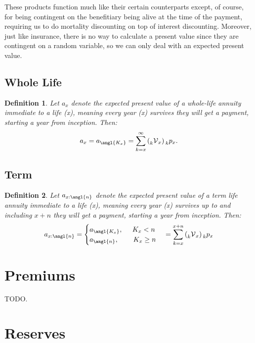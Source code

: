 \documentclass[a4paper]{report}
\newtheorem{definition}{Definition}
\newcommand{\p}[2]{\prescript{}{#1}{p}_{#2}}
\newcommand{\disc}[2]{\prescript{}{#1}{\mathcal{V}}_{#2}}
\begin{document}
  These products function much like their certain 
  counterparts except, of course, for being contingent on 
  the benefitiary being alive at the time of the payment, 
  requiring us to do mortality discounting on top of 
  interest discounting. 
  Moreover, just like insurance, there is no way to 
  calculate a present value since they are contingent on a 
  random variable, so we can only deal with an expected 
  present value.

  \subsection{Whole Life}
  \begin{definition}
    Let $a_x$ denote the expected present value of a 
    whole-life annuity immediate to a life (x), 
    meaning every year (x) survives they will get a payment,      starting a year from inception. Then:
    \[
      a_x = a_{\angl{K_x}} 
      = \sum^{\infty}_{k=x} \left(\disc{k}{x}\right)\p{k}{x}
    .\] 
  \end{definition}

  \subsection{Term}
  \begin{definition}
    Let $a_{x:\angl{n}}$ denote the expected present value 
    of a term life annuity immediate to a life (x), 
    meaning every year (x) survives up to and including $x+n$
     they will get a payment, starting a year from inception.	 Then:
    \begin{align*}
      a_{x:\angl{n}} = 
      \begin{cases}
	a_{\angl{K_x}}, \phantom{n-} K_x < n \\
	a_{\angl{n}}, \phantom{K_x-} K_x \ge n
      \end{cases}
      = \sum^{x+n}_{k=x} \left(\disc{k}{x}\right)\p{k}{x}
    \end{align*}
  \end{definition}
  
  \section{Premiums}

    TODO.

  \section{Reserves}
\end{document}
